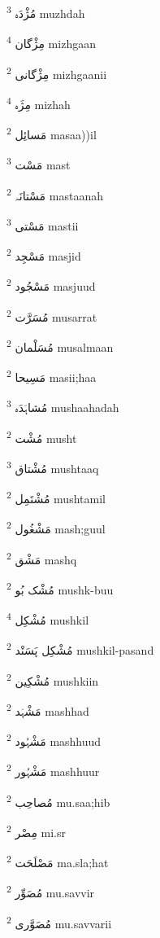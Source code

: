 \documentclass[12pt]{article}
\begin{document}
\begin{multicols}{5}
{\ur مُژْدَہ}   \textsuperscript{3} muzhdah

{\ur مِژْگان}   \textsuperscript{4} mizhgaan

{\ur مِژْگانی}   \textsuperscript{2} mizhgaanii

{\ur مِژَہ}   \textsuperscript{4} mizhah

{\ur مَسائِل}   \textsuperscript{2} masaa))il

{\ur مَسْت}   \textsuperscript{3} mast

{\ur مَسْتانَہ}   \textsuperscript{2} mastaanah

{\ur مَسْتی}   \textsuperscript{3} mastii

{\ur مَسْجِد}   \textsuperscript{2} masjid

{\ur مَسْجُود}   \textsuperscript{2} masjuud

{\ur مُسَرَّت}   \textsuperscript{2} musarrat

{\ur مُسَلْمان}   \textsuperscript{2} musalmaan

{\ur مَسِیحا}   \textsuperscript{2} masii;haa

{\ur مُشاہَدَہ}   \textsuperscript{3} mushaahadah

{\ur مُشْت}   \textsuperscript{2} musht

{\ur مُشْتاق}   \textsuperscript{3} mushtaaq

{\ur مُشْتَمِل}   \textsuperscript{2} mushtamil

{\ur مَشْغُول}   \textsuperscript{2} mash;guul

{\ur مَشْق}   \textsuperscript{2} mashq

{\ur مُشْک بُو}   \textsuperscript{2} mushk-buu

{\ur مُشْکِل}   \textsuperscript{4} mushkil

{\ur مُشْکِل پَسَنْد}   \textsuperscript{2} mushkil-pasand

{\ur مُشْکِین}   \textsuperscript{2} mushkiin

{\ur مَشْہَد}   \textsuperscript{2} mashhad

{\ur مَشْہُود}   \textsuperscript{2} mashhuud

{\ur مَشْہُور}   \textsuperscript{2} mashhuur

{\ur مُصاحِب}   \textsuperscript{2} mu.saa;hib

{\ur مِصْر}   \textsuperscript{2} mi.sr

{\ur مَصْلَحَت}   \textsuperscript{2} ma.sla;hat

{\ur مُصَوِّر}   \textsuperscript{2} mu.savvir

{\ur مُصَوَّری}   \textsuperscript{2} mu.savvarii


\end{multicols}
\end{document}
